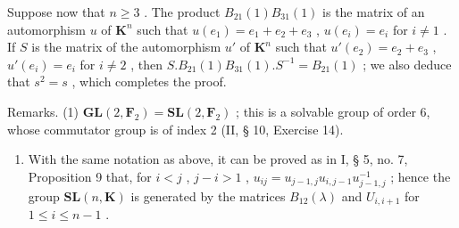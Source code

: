 Suppose now that \(n \geqslant 3\) . The product \(B_{21}(1)B_{31}(1)\) is the matrix of an automorphism \(u\) of \(\mathbf{K}^n\) such that \(u(e_1) = e_1 + e_2 + e_3\) , \(u(e_i) = e_i\) for \(i \neq 1\) . If \(S\) is the matrix of the automorphism \(u'\) of \(\mathbf{K}^n\) such that \(u'(e_2) = e_2 + e_3\) , \(u'(e_i) = e_i\) for \(i \neq 2\) , then \(S.B_{21}(1)B_{31}(1).S^{-1} = B_{21}(1)\) ; we also deduce that \(s^2 = s\) , which completes the proof.

Remarks. (1) \(\mathbf{GL}(2, \mathbf{F}_2) = \mathbf{SL}(2, \mathbf{F}_2)\) ; this is a solvable group of order 6, whose commutator group is of index 2 (II, § 10, Exercise 14).

\begin{enumerate}
\def\labelenumi{(\arabic{enumi})}
\setcounter{enumi}{1}
\tightlist
\item
  With the same notation as above, it can be proved as in I, § 5, no. 7, Proposition 9 that, for \(i < j\) , \(j - i > 1\) , \(u_{ij} = u_{j-1,j} u_{i,j-1} u_{j-1,j}^{-1}\) ; hence the group \(\mathbf{SL}(n, \mathbf{K})\) is generated by the matrices \(B_{12}(\lambda)\) and \(U_{i,i+1}\) for \(1 \leqslant i \leqslant n - 1\) .
\end{enumerate}

